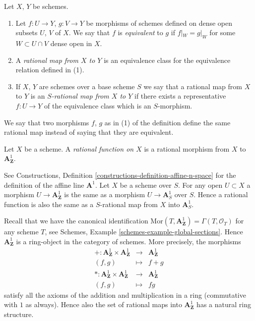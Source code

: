 \begin{definition}
\label{definition-rational-map}
Let $X$, $Y$ be schemes.
\begin{enumerate}
\item Let $f : U \to Y$, $g : V \to Y$ be morphisms of schemes defined
on dense open subsets $U$, $V$ of $X$. We say that $f$ is
{\it equivalent} to $g$ if $f|_W = g|_W$ for some $W \subset U \cap V$
dense open in $X$.
\item A {\it rational map from $X$ to $Y$}
is an equivalence class for the equivalence relation defined in (1).
\item If $X$, $Y$ are schemes over a base scheme $S$ we say that
a rational map from $X$ to $Y$ is an {\it $S$-rational map from $X$
to $Y$} if there exists a representative $f : U \to Y$ of the equivalence
class which is an $S$-morphism.
\end{enumerate}
\end{definition}

\noindent
We say that two morphisms $f$, $g$ as in (1) of the definition
define the same rational map instead of saying that they are equivalent.

\begin{definition}
\label{definition-rational-function}
Let $X$ be a scheme. A {\it rational function on $X$} is a rational morphism
from $X$ to $\mathbf{A}^1_{\mathbf{Z}}$.
\end{definition}

\noindent
See Constructions, Definition \ref{constructions-definition-affine-n-space}
for the definition of the affine line $\mathbf{A}^1$. Let $X$ be a scheme
over $S$. For any open $U \subset X$ a morphism
$U \to \mathbf{A}^1_{\mathbf{Z}}$ is the same as a morphism
$U \to \mathbf{A}^1_S$ over $S$. Hence a rational function is
also the same as a $S$-rational map from $X$ into $\mathbf{A}^1_S$.

\medskip\noindent
Recall that we have the canonical identification
$\text{Mor}(T, \mathbf{A}^1_{\mathbf{Z}}) = \Gamma(T, \mathcal{O}_T)$
for any scheme $T$, see Schemes, Example \ref{schemes-example-global-sections}.
Hence $\mathbf{A}^1_{\mathbf{Z}}$ is a ring-object in the
category of schemes. More precisely, the morphisms
\begin{eqnarray*}
+ : \mathbf{A}^1_{\mathbf{Z}} \times \mathbf{A}^1_{\mathbf{Z}}
& \longrightarrow &
\mathbf{A}^1_{\mathbf{Z}} \\
(f, g) & \longmapsto & f + g \\
* : \mathbf{A}^1_{\mathbf{Z}} \times \mathbf{A}^1_{\mathbf{Z}}
& \longrightarrow &
\mathbf{A}^1_{\mathbf{Z}} \\
(f, g) & \longmapsto & fg
\end{eqnarray*}
satisfy all the axioms of the addition and multiplication in a ring
(commutative with $1$ as always). Hence also the set of rational
maps into $\mathbf{A}^1_{\mathbf{Z}}$ has a natural ring structure.

